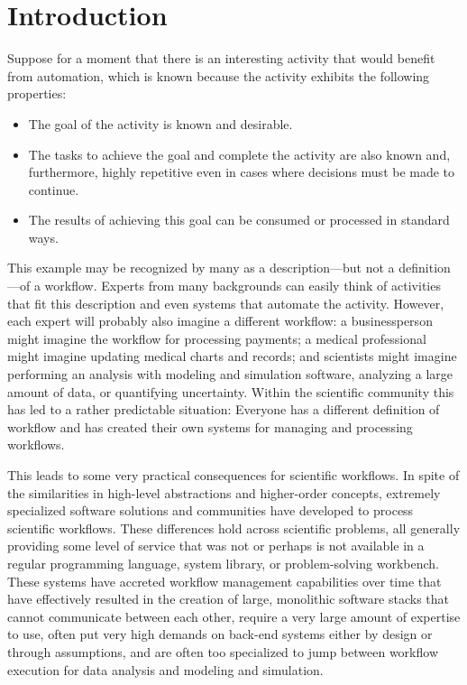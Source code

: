 \section{Introduction}

Suppose for a moment that there is an interesting activity that would benefit
from automation, which is known because the activity exhibits the following
properties: 
\begin{itemize} 
\item The goal of the activity is known and desirable.  
\item The tasks to achieve the goal and complete the activity are also known 
and, furthermore, highly repetitive even in cases where decisions must be 
made to continue.  
\item The results of achieving this goal can be consumed or processed in 
standard ways.  
\end{itemize}

This example may be recognized by many as a description---but not a definition---of a workflow. Experts from many backgrounds can easily think
of activities that fit this description and even systems that automate the
activity. However, each expert will probably also imagine a different workflow:
a businessperson might imagine the workflow for processing payments; a medical
professional might imagine updating medical charts and records; and
scientists might imagine performing an analysis with modeling and simulation
software, analyzing a large amount of data, or quantifying uncertainty. Within
the scientific community this has led to a rather predictable situation:
Everyone has a different definition of workflow and has created their own
systems for managing and processing workflows.

This leads to some very practical consequences for scientific
workflows. In spite of the similarities in high-level abstractions and
higher-order concepts, extremely specialized software solutions and communities
have developed to process scientific workflows. These differences hold across
scientific problems, all generally providing some level of service that was not
or perhaps is not available in a regular programming language, system library,
or problem-solving workbench. These systems have accreted workflow management
capabilities over time that have effectively resulted in the creation of large,
monolithic software stacks that cannot communicate between each other, require a
very large amount of expertise to use, often put very high demands on back-end
systems either by design or through assumptions, and are often too specialized
to jump between workflow execution for data analysis and modeling and
simulation. 

